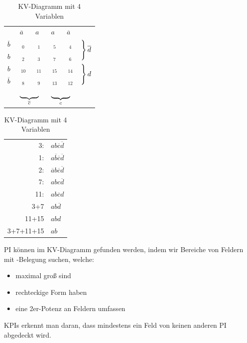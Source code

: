 \documentclass[10pt,a4paper]{scrartcl}
\begin{document}
\begin{table}[h!]
	\centering
	\begin{tabular}{c|c|c|c|c|l}
		& $ \overline{a} $ & $ a $ & $ a $ & $ \overline{a} $ &\\ \cline{1-5}
		$ \overline{b} $ & $ \phantom{a}_0 $ & $ \phantom{a}_1 $ & $ \phantom{a}_5 $ & $ \phantom{a}_4 $& \multirow{2}{*}{$\begin{rcases*} \\ \\ \end{rcases*} \overline{d}$}\\ \cline{1-5}
		$ b $ & $ \phantom{a}_2 $ & $ \phantom{a}_3 $ & $ \phantom{a}_7 $ & $ \phantom{a}_6 $ \\ \cline{1-5}
		$ b $ & $ \phantom{a}_{10} $ & $ \phantom{a}_{11} $ & $ \phantom{a}_{15} $ & $ \phantom{a}_{14} $ & \multirow{2}{*}{$ \begin{rcases*} \\ \\ \end{rcases*} d $}\\ \cline{1-5}
		$ \overline{b} $ & $ \phantom{a}_{8} $ & $ \phantom{a}_{9} $ & $ \phantom{a}_{13} $ & $ \phantom{a}_{12} $ \\ \cline{1-5}
		\multicolumn{1}{c}{}& \multicolumn{2}{c}{$ \underbrace{\hspace*{\dimexpr2\tabcolsep+1\arrayrulewidth}\hphantom{012}}_{\overline{c}} $}& \multicolumn{2}{c}{$ \underbrace{\hspace*{\dimexpr2\tabcolsep+1\arrayrulewidth}\hphantom{012}}_{c} $}
	\end{tabular}
	\quad
	\begin{tabular}{rl}
		3: & $ ab\overline{c} \overline{d}$\\
		1: & $ a  \overline{b} \overline{c} \overline{d} $\\
		2: & $ \overline{a} b \overline{c} \overline{d} $\\
		7: & $ abc\overline{d} $\\
	 11: & $ ab\overline{c}d $\\
	 3+7 & $ ab\overline{d} $\\
	 11+15 & $ abd $\\
	 3+7+11+15 & $ ab $\\
	\end{tabular}
\caption{KV-Diagramm mit 4 Variablen}
\end{table}

\FloatBarrier
\noindent
\ac{PI} können im KV-Diagramm gefunden werden, indem wir Bereiche von Feldern mit \grqq-Belegung suchen, welche:
\begin{itemize}
	\item maximal groß sind
	\item rechteckige Form haben
	\item eine 2er-Potenz an Feldern umfassen
\end{itemize}
\acfp*{KPI} erkennt man daran, dass mindestens ein Feld von keinen anderen \ac{PI} abgedeckt wird.\\
\end{document}
